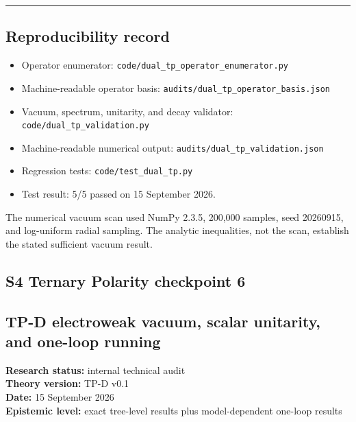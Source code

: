 \documentclass[
]{article}
\providecommand{\tightlist}{%
  \setlength{\itemsep}{0pt}\setlength{\parskip}{0pt}}
\begin{document}
\begin{center}\rule{0.5\linewidth}{0.5pt}\end{center}

\hypertarget{reproducibility-record-1}{%
\subsection{Reproducibility record}\label{reproducibility-record-1}}

\begin{itemize}
\tightlist
\item
  Operator enumerator: \texttt{code/dual\_tp\_operator\_enumerator.py}
\item
  Machine-readable operator basis:
  \texttt{audits/dual\_tp\_operator\_basis.json}
\item
  Vacuum, spectrum, unitarity, and decay validator:
  \texttt{code/dual\_tp\_validation.py}
\item
  Machine-readable numerical output:
  \texttt{audits/dual\_tp\_validation.json}
\item
  Regression tests: \texttt{code/test\_dual\_tp.py}
\item
  Test result: 5/5 passed on 15 September 2026.
\end{itemize}

The numerical vacuum scan used NumPy 2.3.5, 200,000 samples, seed
20260915, and log-uniform radial sampling. The analytic inequalities,
not the scan, establish the stated sufficient vacuum result.

\newpage

\hypertarget{s4-ternary-polarity-checkpoint-6}{%
\subsection{S4 Ternary Polarity checkpoint
6}\label{s4-ternary-polarity-checkpoint-6}}

\hypertarget{tp-d-electroweak-vacuum-scalar-unitarity-and-one-loop-running}{%
\subsection{TP-D electroweak vacuum, scalar unitarity, and one-loop
running}\label{tp-d-electroweak-vacuum-scalar-unitarity-and-one-loop-running}}

\textbf{Research status:} internal technical audit\\
\textbf{Theory version:} TP-D v0.1\\
\textbf{Date:} 15 September 2026\\
\textbf{Epistemic level:} exact tree-level results plus model-dependent
one-loop results
\end{document}
